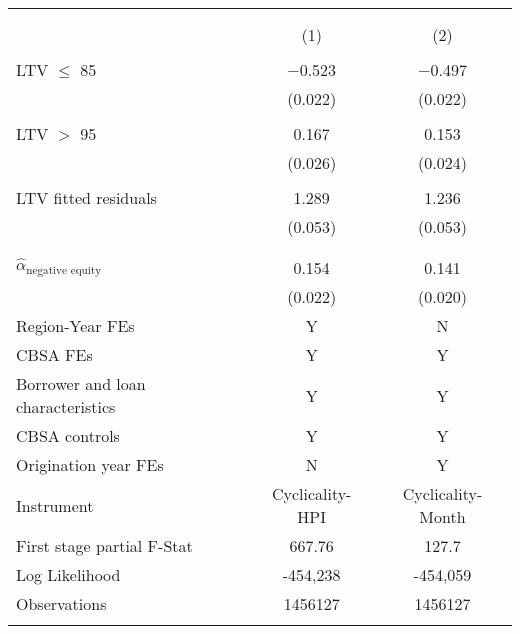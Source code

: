 
\begin{tabular}{@{\extracolsep{5pt}}lcc} 
\\[-1.8ex]\hline 
\hline \\[-1.8ex] 
\\[-1.8ex] & (1) & (2)\\ 
\hline \\[-1.8ex] 
 LTV $\leq$ 85 & $-$0.523 & $-$0.497 \\ 
  & (0.022) & (0.022) \\ 
  & & \\ 
 LTV $>$ 95 & 0.167 & 0.153 \\ 
  & (0.026) & (0.024) \\ 
  & & \\ 
 LTV fitted residuals & 1.289 & 1.236 \\ 
  & (0.053) & (0.053) \\ 
  & & \\ 
\hline \\[-1.8ex] 
$\hat{\alpha}_{\text{negative equity}}$ & 0.154 & 0.141 \\ 
 & (0.022) & (0.020) \\ 
Region-Year FEs & Y & N \\ 
CBSA FEs & Y & Y \\ 
Borrower and loan characteristics & Y & Y \\ 
CBSA controls & Y & Y \\ 
Origination year FEs & N & Y \\ 
Instrument & Cyclicality-HPI & Cyclicality-Month \\ 
First stage partial F-Stat & 667.76 & 127.7 \\ 
Log Likelihood & -454,238 & -454,059 \\ 
Observations & 1456127 & 1456127 \\ 
\hline \\[-1.8ex] 
\end{tabular} 
